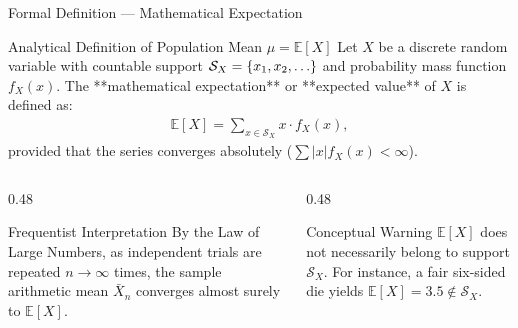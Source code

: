 \documentclass[aspectratio=169,xcolor={dvipsnames,table}]{beamer}
\begin{document}
\begin{frame}{Formal Definition --- Mathematical Expectation}
	\begin{block}{Analytical Definition of Population Mean $\mu = \mathbb{E}[X]$}
		\small
		Let $X$ be a discrete random variable with countable support $\mathcal{S}_X = \set{x_1, x_2, \dots}$ and probability mass function $f_X(x)$. The **mathematical expectation** or **expected value** of $X$ is defined as:
		\begin{align*}
			\mathbb{E}[X] = \sum_{x \in \mathcal{S}_X} x \cdot f_X(x),
		\end{align*}
		provided that the series converges absolutely ($\sum |x| f_X(x) < \infty$).
	\end{block}
	\vspace{-0.1cm}
	\begin{columns}[T]
		\begin{column}{0.48\textwidth}
			\begin{exampleblock}{Frequentist Interpretation}
				\footnotesize
				By the Law of Large Numbers, as independent trials are repeated $n \to \infty$ times, the sample arithmetic mean $\bar{X}_n$ converges almost surely to $\mathbb{E}[X]$.
			\end{exampleblock}
		\end{column}
		\begin{column}{0.48\textwidth}
			\begin{alertblock}{Conceptual Warning}
				\footnotesize
				$\mathbb{E}[X]$ does not necessarily belong to support $\mathcal{S}_X$. For instance, a fair six-sided die yields $\mathbb{E}[X] = 3.5 \notin \mathcal{S}_X$.
			\end{alertblock}
		\end{column}
	\end{columns}
\end{frame}
\end{document}
